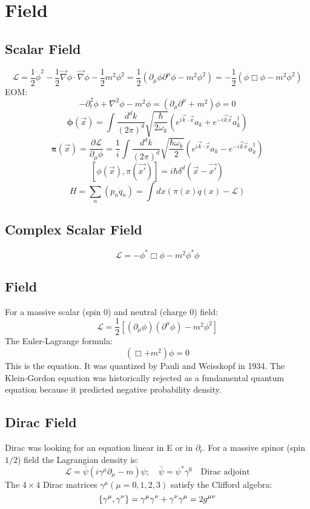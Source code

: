 \section{Field}
\subsection{Scalar Field}
\[ \mathcal{L} = \frac{1}{2}\dot{\phi}^{2} -
\frac{1}{2}\vec{\nabla}\phi \cdot \vec{\nabla}\phi - \frac{1}{2}m^{2}\phi^{2} 
= \frac{1}{2}(\partial_{\mu}\phi\partial^{\mu}\phi - m^{2}\phi^{2}) 
=-\frac{1}{2}(\phi\Box\phi-m^2\phi^2)	\]
EOM:
$$ -\partial_{t}^{2}\phi + \nabla^{2}\phi - m^{2}\phi =
(\partial_{\mu}\partial^{\mu} + m^{2}) \phi = 0 $$
$$ \pmb{\phi}(\vec{x}) = \int
\frac{d^{d}k}{(2\pi)^{d}}\sqrt{\frac{\hbar}{2\omega_{k}}}(e^{i\vec{k}\cdot\vec{x}}a_{k}+e^{-i\vec{k}\vec{x}}a_{k}^{\dag})$$
$$ \pmb{\pi}(\vec{x}) = \frac{\partial{\mathcal{L}}}{\partial_{\mu}\phi} =
\frac{1}{i} \int \frac{d^{d}k}{(2\pi)^{d}}\sqrt{\frac{\hbar\omega_{k}}{2}}(e^{i\vec{k}\cdot\vec{x}}a_{k}-e^{-i\vec{k}\vec{x}}a_{k}^{\dag}) $$
$$ [\phi(\vec{x}), \pi(\vec{x'})] = i\hbar\delta^{d}(\vec{x} - \vec{x'})$$
$$ H =\sum_{n}(p_{n}\dot{q}_n) = \int dx(\pi(x)\dot{q}(x) -
\mathcal{L})  $$

\subsection{Complex Scalar Field}
\[  \mathcal{L}=-\phi^*\Box\phi-m^2\phi^*\phi\]

\subsection{\KG{} Field}
For a massive scalar (spin 0) and neutral (charge 0) field:
$$\mathcal{L} = \frac{1}{2} [(\partial_{\mu}\phi)(\partial^{\mu}\phi) -
m^{2} \phi^{2}]$$
The Euler-Lagrange formula:
$$ (\Box + m^{2})\phi = 0$$
This is the \KG{} equation. It was quantized by Pauli and Weisskopf in 1934.
The Klein-Gordon equation was historically rejected as a fundamental quantum
equation because it predicted negative probability density.

\subsection{Dirac Field}
Dirac was looking for an equation linear in E or in $\partial_t$. For a
massive spinor (spin $1/2$) field the Lagrangian density is:
$$ \mathcal{L} = \bar{\psi}(i\gamma^{\mu}\partial_{\mu} - m)\psi; \quad
\bar{\psi} = \psi^{*}\gamma^{0} \quad \text{Dirac adjoint} $$
The $4 \times 4$ Dirac matrices $\gamma^{\mu} (\mu = 0,1,2,3)$ satisfy the
Clifford algebra:
\[ 
    \{\gamma^{\mu},\gamma^{\nu}\}=\gamma^{\mu}\gamma^{\nu}+\gamma^{\nu}\gamma^{\mu}=2g^{\mu\nu} 
\]

